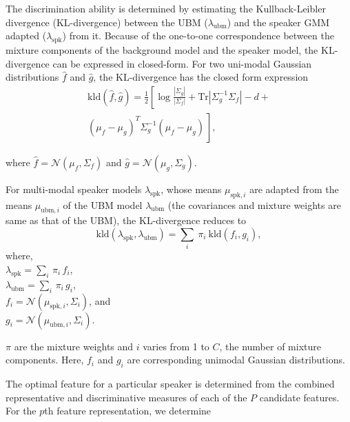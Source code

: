 \documentclass{article}
\begin{document}
The discrimination ability is determined by estimating the Kullback-Leibler divergence
(KL-divergence) between the UBM ($\lambda_{\textrm{ubm}}$) and the speaker GMM adapted 
($\lambda_{\textrm{spk}}$) from it. Because of the one-to-one
correspondence between the mixture components of the background model and the speaker model, 
the KL-divergence can be expressed in closed-form. For two uni-modal Gaussian distributions
$\hat{f}$ and $\hat{g}$, the KL-divergence has the closed form expression
\begin{equation}
\begin{split}
\textrm{kld}(\hat{f},\hat{g}) = \frac{1}{2}\left[ \log \frac{|\Sigma_g|}{|\Sigma_f|} +
	\textrm{Tr}|\Sigma^{-1}_g\Sigma_f| - d + \right. \\ 
\left. (\mu_f-\mu_g)^T\Sigma_g^{-1}(\mu_f-\mu_g) \frac{}{} \right], 
\end{split}
\label{eq:kldGaussians}
\end{equation}

where $\hat{f} = \mathcal{N}(\mu_f,\Sigma_f)$ and $\hat{g} = \mathcal{N}(\mu_g,\Sigma_g)$.

For multi-modal speaker models $\lambda_{\textrm{spk}}$, whose means
$\mu_{\textrm{spk},i}$ are adapted from the means $\mu_{\textrm{ubm},i}$ of the UBM
model $\lambda_{\textrm{ubm}}$ (the covariances and mixture weights are same as
that of the UBM), the KL-divergence reduces to 
\begin{equation}
\textrm{kld}(\lambda_{\textrm{spk}},\lambda_{\textrm{ubm}}) = 
	\displaystyle \sum_i\ \pi_i\ \textrm{kld}(f_i,g_i),
\label{eq:gmmAdaptedKLD}
\end{equation}
where, \\
$\lambda_{\textrm{spk}} = \displaystyle \sum_i \, \pi_i \, f_i$, \\
$\lambda_{\textrm{ubm}} = \displaystyle\sum_i \, \pi_i \, g_i$, \\
$f_i = \mathcal{N}(\mu_{\textrm{spk},i},\Sigma_i)$, and \\
$g_i = \mathcal{N}(\mu_{\textrm{ubm},i},\Sigma_i)$.

\noindent $\pi$ are the mixture weights and
$i$ varies from 1 to $C$, the number of mixture components. Here, $f_i$ and $g_i$ are
corresponding unimodal Gaussian distributions.


The optimal feature for a particular speaker is determined from the combined
representative and discriminative measures of each of the $P$ candidate
features. For the $p$th feature representation, we determine
\end{document}
